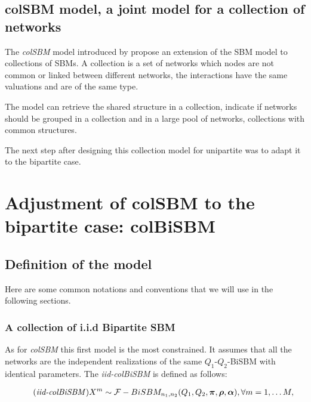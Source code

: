 \documentclass[12pt,a4paper]{report}
\begin{document}
\section{colSBM model, a joint model for a collection of networks}

The \emph{colSBM} model introduced by \cite{chabert-liddellLearningCommonStructures2023}
propose an extension of the SBM model to collections of SBMs. A collection is a
set of networks which nodes are not common or linked between different networks,
the interactions have the same valuations and are of the same type.

The model can retrieve the shared structure in a collection, indicate
if networks should be grouped in a collection and  in a large pool of networks,
collections with common structures.

The next step after designing this collection model for unipartite was to adapt
it to the bipartite case.

\chapter{Adjustment of colSBM to the bipartite case: colBiSBM}

\section{Definition of the model}
Here are some common notations and conventions that we will use in the following
sections.

\subsection{A collection of i.i.d Bipartite SBM}

As for \emph{colSBM} this first model is the most constrained. It assumes
that all the networks are the independent realizations of the same $Q_1$-$Q_2$-BiSBM
with identical parameters. The \emph{iid-colBiSBM} is defined as follows:

\begin{align}
    \tag{\emph{iid-colBiSBM}}
    X^m \sim \mathcal{F}-BiSBM_{n_1,n_2} (Q_1, Q_2, \bm{\pi}, \bm{\rho}, \bm{\alpha}), \forall m = 1, \dots M,
\end{align}
\end{document}
